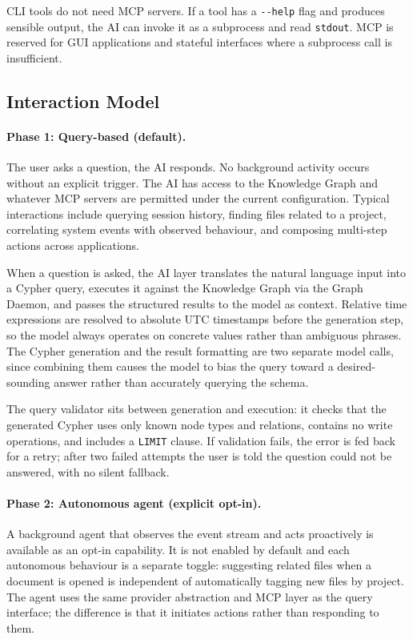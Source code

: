CLI tools do not need MCP servers. If a tool has a \texttt{-{}-help} flag and
produces sensible output, the AI can invoke it as a subprocess and read
\texttt{stdout}. MCP is reserved for GUI applications and stateful interfaces
where a subprocess call is insufficient.

\subsection{Interaction Model}
\label{sec:ai-interaction}

\paragraph{Phase 1: Query-based (default).}
The user asks a question, the AI responds. No background activity occurs
without an explicit trigger. The AI has access to the Knowledge Graph and
whatever MCP servers are permitted under the current configuration. Typical
interactions include querying session history, finding files related to a
project, correlating system events with observed behaviour, and composing
multi-step actions across applications.

When a question is asked, the AI layer translates the natural language input
into a Cypher query, executes it against the Knowledge Graph via the Graph
Daemon, and passes the structured results to the model as context. Relative
time expressions are resolved to absolute UTC timestamps before the generation
step, so the model always operates on concrete values rather than ambiguous
phrases. The Cypher generation and the result formatting are two separate model
calls, since combining them causes the model to bias the query toward a
desired-sounding answer rather than accurately querying the schema.

The query validator sits between generation and execution: it checks that the
generated Cypher uses only known node types and relations, contains no write
operations, and includes a \texttt{LIMIT} clause. If validation fails, the
error is fed back for a retry; after two failed attempts the user is told the
question could not be answered, with no silent fallback.

\paragraph{Phase 2: Autonomous agent (explicit opt-in).}
A background agent that observes the event stream and acts proactively is
available as an opt-in capability. It is not enabled by default and each
autonomous behaviour is a separate toggle: suggesting related files when a
document is opened is independent of automatically tagging new files by
project. The agent uses the same provider abstraction and MCP layer as the
query interface; the difference is that it initiates actions rather than
responding to them.

